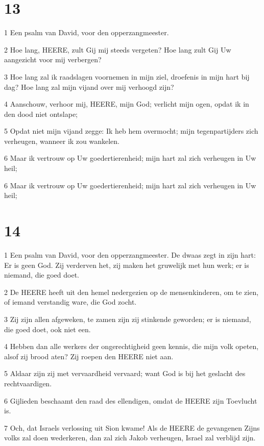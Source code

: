\chapter{13}

\par 1 Een psalm van David, voor den opperzangmeester.
\par 2 Hoe lang, HEERE, zult Gij mij steeds vergeten? Hoe lang zult Gij Uw aangezicht voor mij verbergen?
\par 3 Hoe lang zal ik raadslagen voornemen in mijn ziel, droefenis in mijn hart bij dag? Hoe lang zal mijn vijand over mij verhoogd zijn?
\par 4 Aanschouw, verhoor mij, HEERE, mijn God; verlicht mijn ogen, opdat ik in den dood niet ontslape;
\par 5 Opdat niet mijn vijand zegge: Ik heb hem overmocht; mijn tegenpartijders zich verheugen, wanneer ik zou wankelen.
\par 6 Maar ik vertrouw op Uw goedertierenheid; mijn hart zal zich verheugen in Uw heil;
\par 6 Maar ik vertrouw op Uw goedertierenheid; mijn hart zal zich verheugen in Uw heil;

\chapter{14}

\par 1 Een psalm van David, voor den opperzangmeester. De dwaas zegt in zijn hart: Er is geen God. Zij verderven het, zij maken het gruwelijk met hun werk; er is niemand, die goed doet.
\par 2 De HEERE heeft uit den hemel nedergezien op de mensenkinderen, om te zien, of iemand verstandig ware, die God zocht.
\par 3 Zij zijn allen afgeweken, te zamen zijn zij stinkende geworden; er is niemand, die goed doet, ook niet een.
\par 4 Hebben dan alle werkers der ongerechtigheid geen kennis, die mijn volk opeten, alsof zij brood aten? Zij roepen den HEERE niet aan.
\par 5 Aldaar zijn zij met vervaardheid vervaard; want God is bij het geslacht des rechtvaardigen.
\par 6 Gijlieden beschaamt den raad des ellendigen, omdat de HEERE zijn Toevlucht is.
\par 7 Och, dat Israels verlossing uit Sion kwame! Als de HEERE de gevangenen Zijns volks zal doen wederkeren, dan zal zich Jakob verheugen, Israel zal verblijd zijn.

